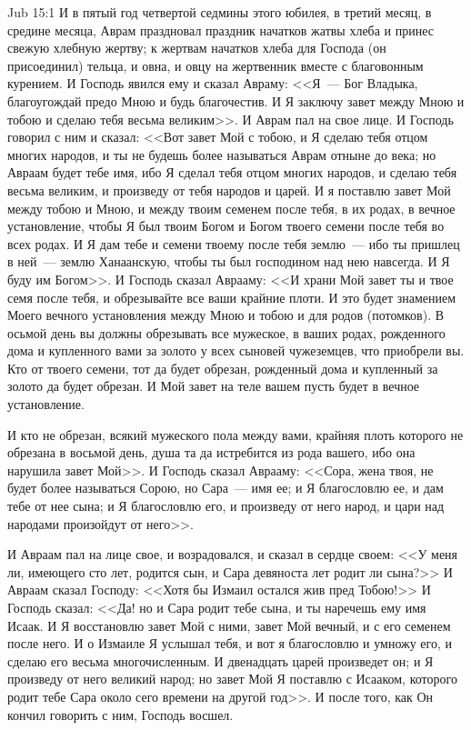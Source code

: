 \vs Jub 15:1
И в пятый год четвертой седмины этого юбилея, в
третий месяц, в средине месяца, Аврам праздновал
праздник начатков жатвы хлеба и принес свежую
хлебную жертву; к жертвам начатков хлеба для
Господа (он присоединил) тельца, и овна, и овцу на
жертвенник вместе с благовонным курением. И
Господь явился ему и сказал Авраму: <<Я~--- Бог
Владыка, благоугождай предо Мною и будь
благочестив. И Я заключу завет между Мною и тобою
и сделаю тебя весьма великим>>. И Аврам пал на
свое лице. И Господь говорил с ним и сказал:
<<Вот завет Мой с тобою, и Я сделаю тебя отцом
многих народов, и ты не будешь более называться
Аврам отныне до века; но Авраам будет тебе имя, ибо
Я сделал тебя отцом многих народов, и сделаю тебя
весьма великим, и произведу от тебя народов и
царей. И я поставлю завет Мой между тобою и Мною, и
между твоим семенем после тебя, в их родах, в
вечное установление, чтобы Я был твоим Богом и
Богом твоего семени после тебя во всех родах. И
Я дам тебе и семени твоему после тебя землю~---
ибо ты пришлец в ней~--- землю Ханаанскую, чтобы ты
был господином над нею навсегда. И Я буду им
Богом>>. И Господь сказал Аврааму: <<И храни
Мой завет ты и твое семя после тебя, и обрезывайте
все ваши крайние плоти. И это будет знамением
Моего вечного установления между Мною и тобою и
для родов (потомков). В осьмой день вы должны
обрезывать все мужеское, в ваших родах,
рожденного дома и купленного вами за золото у
всех сыновей чужеземцев, что приобрели вы. Кто от
твоего семени, тот да будет обрезан, рожденный
дома и купленный за золото да будет обрезан. И Мой
завет на теле вашем пусть будет в вечное
установление.

И кто не обрезан, всякий мужеского пола между
вами, крайняя плоть которого не обрезана в
восьмой день, душа та да истребится из рода
вашего, ибо она нарушила завет Мой>>. И Господь
сказал Аврааму: <<Сора, жена твоя, не будет более
называться Сорою, но Сара~--- имя ее; и Я благословлю
ее, и дам тебе от нее сына; и Я благословлю его, и
произведу от него народ, и цари над народами
произойдут от него>>.

И Авраам пал на лице свое, и возрадовался, и
сказал в сердце своем: <<У меня ли, имеющего сто
лет, родится сын, и Сара девяноста лет родит ли
сына?>> И Авраам сказал Господу: <<Хотя бы
Измаил остался жив пред Тобою!>> И Господь
сказал: <<Да! но и Сара родит тебе сына, и ты
наречешь ему имя Исаак. И Я восстановлю завет Мой
с ними, завет Мой вечный, и с его семенем после
него. И о Измаиле Я услышал тебя, и вот я
благословлю и умножу его, и сделаю его весьма
многочисленным. И двенадцать царей произведет
он; и Я произведу от него великий народ; но завет
Мой Я поставлю с Исааком, которого родит тебе
Сара около сего времени на другой год>>. И после
того, как Он кончил говорить с ним, Господь
восшел.

